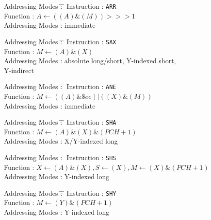 \documentclass[12pt,twoside]{report}
\newcommand{\tty}[1]{{\tt #1}}
\begin{document}
\begin{tabbing}
Addressing Modes \= : \= \kill
Instruction      \> : \> \tty{ARR} \\
Function         \> : \> $A\leftarrow((A)\&(M))>>>1$ \\
Addressing Modes \> : \> immediate \\
\end{tabbing}

\begin{tabbing}
Addressing Modes \= : \= \kill
Instruction      \> : \> \tty{SAX} \\
Function         \> : \> $M\leftarrow(A)\&(X)$ \\
Addressing Modes \> : \> absolute long/short, Y-indexed short, \\
                 \>   \> Y-indirect \\
\end{tabbing}

\begin{tabbing}
Addressing Modes \= : \= \kill
Instruction      \> : \> \tty{ANE} \\
Function         \> : \> $M\leftarrow((A)\&\$ee)|((X)\&(M))$ \\
Addressing Modes \> : \> immediate \\
\end{tabbing}

\begin{tabbing}
Addressing Modes \= : \= \kill
Instruction      \> : \> \tty{SHA} \\
Function         \> : \> $M\leftarrow(A)\&(X)\&(PCH+1)$ \\
Addressing Modes \> : \> X/Y-indexed long \\
\end{tabbing}

\begin{tabbing}
Addressing Modes \= : \= \kill
Instruction      \> : \> \tty{SHS} \\
Function         \> : \> $X\leftarrow(A)\&(X), S\leftarrow(X), M\leftarrow(X)\&(PCH+1)$ \\
Addressing Modes \> : \> Y-indexed long \\
\end{tabbing}

\begin{tabbing}
Addressing Modes \= : \= \kill
Instruction      \> : \> \tty{SHY} \\
Function         \> : \> $M\leftarrow(Y)\&(PCH+1)$ \\
Addressing Modes \> : \> Y-indexed long \\
\end{tabbing}
\end{document}
